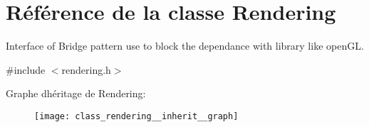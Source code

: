 \hypertarget{class_rendering}{}\section{Référence de la classe Rendering}
\label{class_rendering}


Interface of Bridge pattern use to block the dependance with library like open\+GL.  




{\ttfamily \#include $<$rendering.\+h$>$}



Graphe d\textquotesingle{}héritage de Rendering\+:\nopagebreak
\begin{figure}[H]
\begin{center}
\leavevmode
\texttt{[image: class\_rendering\_\_inherit\_\_graph]}
\end{center}
\end{figure}
